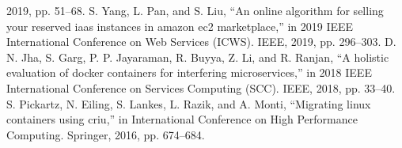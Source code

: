 \begin{thebibliography}{99}
2019, pp. 51–68.
 S. Yang, L. Pan, and S. Liu, “An online algorithm for selling your
reserved iaas instances in amazon ec2 marketplace,” in 2019 IEEE
International Conference on Web Services (ICWS). IEEE, 2019, pp.
296–303.
  D. N. Jha, S. Garg, P. P. Jayaraman, R. Buyya, Z. Li, and R. Ranjan, “A
holistic evaluation of docker containers for interfering microservices,”
in 2018 IEEE International Conference on Services Computing (SCC).
IEEE, 2018, pp. 33–40.
 S. Pickartz, N. Eiling, S. Lankes, L. Razik, and A. Monti, “Migrating
linux containers using criu,” in International Conference on High
Performance Computing. Springer, 2016, pp. 674–684.

\end{thebibliography}
